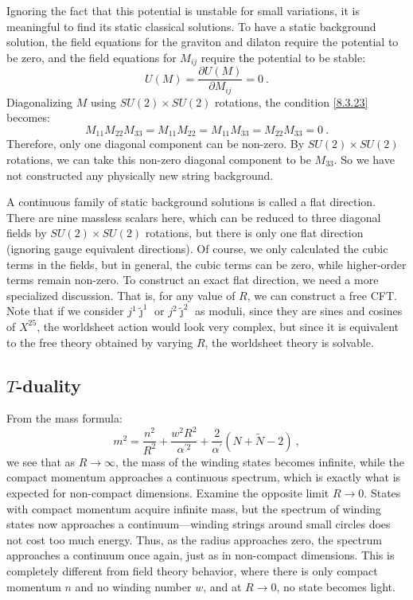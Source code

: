 Ignoring the fact that this potential is unstable for small variations, it is meaningful to find its static classical solutions. To have a static background solution, the field equations for the graviton and dilaton require the potential to be zero, and the field equations for $M_{i j}$ require the potential to be stable:
\begin{equation}
	U(M)=\frac{\partial U(M)}{\partial M_{i j}}=0 \:. \label{8.3.23}
\end{equation}
Diagonalizing $M$ using $S U(2) \times S U(2)$ rotations, the condition \eqref{8.3.23} becomes:
\begin{equation}
	M_{11} M_{22} M_{33}=M_{11} M_{22}=M_{11} M_{33}=M_{22} M_{33}=0 \:. \label{8.3.24}
\end{equation}
Therefore, only one diagonal component can be non-zero. 
By $S U(2) \times S U(2)$ rotations, we can take this non-zero diagonal component to be $M_{33} $. So we have not constructed any physically new string background.

A continuous family of static background solutions is called a flat direction. There are nine massless scalars here, which can be reduced to three diagonal fields by $S U(2) \times S U(2)$ rotations, but there is only one flat direction (ignoring gauge equivalent directions). 
Of course, we only calculated the cubic terms in the fields, but in general, the cubic terms can be zero, while higher-order terms remain non-zero. To construct an exact flat direction, we need a more specialized discussion. 
That is, for any value of $R$, we can construct a free CFT. 
Note that if we consider $j^{1} \tilde{\jmath}^{1}$ or $j^{2} \tilde{\jmath}^{2}$ as moduli, since they are sines and cosines of $X^{25}$, the worldsheet action would look very complex, but since it is equivalent to the free theory obtained by varying $R$, the worldsheet theory is solvable.

\subsection*{$T$-duality}
From the mass formula:
\begin{equation}
	m^{2}=\frac{n^{2}}{R^{2}}+\frac{w^{2} R^{2}}{\alpha^{\prime 2}}+\frac{2}{\alpha^{\prime}}(N+\tilde{N}-2) \:, \label{8.3.25}
\end{equation}
we see that as $R \rightarrow \infty$, the mass of the winding states becomes infinite, while the compact momentum approaches a continuous spectrum, which is exactly what is expected for non-compact dimensions. Examine the opposite limit $R \rightarrow 0$. 
States with compact momentum acquire infinite mass, but the spectrum of winding states now approaches a continuum—winding strings around small circles does not cost too much energy. Thus, as the radius approaches zero, the spectrum approaches a continuum once again, just as in non-compact dimensions. 
This is completely different from field theory behavior, where there is only compact momentum $n$ and no winding number $w$, and at $R \rightarrow 0$, no state becomes light.

